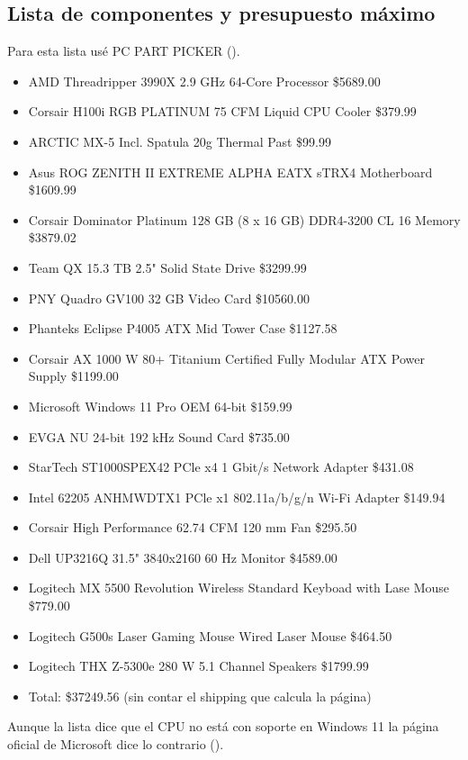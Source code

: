 \documentclass[12pt, a4paper, twocolumn]{article}
\begin{document}
\subsection{Lista de componentes y presupuesto máximo}
Para esta lista usé PC PART PICKER (\cite{partpickermaximum}).
\begin{itemize}
    \item AMD Threadripper 3990X 2.9 GHz 64-Core Processor                          \$5689.00
    \item Corsair H100i RGB PLATINUM 75 CFM Liquid CPU Cooler                       \$379.99
    \item ARCTIC MX-5 Incl. Spatula 20g Thermal Past                                \$99.99
    \item Asus ROG ZENITH II EXTREME ALPHA EATX sTRX4 Motherboard                   \$1609.99
    \item Corsair Dominator Platinum 128 GB (8 x 16 GB) DDR4-3200 CL 16 Memory      \$3879.02
    \item Team QX 15.3 TB 2.5" Solid State Drive                                    \$3299.99
    \item PNY Quadro GV100 32 GB Video Card                                         \$10560.00
    \item Phanteks Eclipse P4005 ATX Mid Tower Case                                 \$1127.58
    \item Corsair AX 1000 W 80+ Titanium Certified Fully Modular ATX Power Supply   \$1199.00
    \item Microsoft Windows 11 Pro OEM 64-bit                                       \$159.99
    \item EVGA NU 24-bit 192 kHz Sound Card                                         \$735.00
    \item StarTech ST1000SPEX42 PCle x4 1 Gbit/s Network Adapter                    \$431.08
    \item Intel 62205 ANHMWDTX1 PCle x1 802.11a/b/g/n Wi-Fi Adapter                 \$149.94
    \item Corsair High Performance 62.74 CFM 120 mm Fan                             \$295.50
    \item Dell UP3216Q 31.5" 3840x2160 60 Hz Monitor                                \$4589.00
    \item Logitech MX 5500 Revolution Wireless Standard Keyboad with Lase Mouse     \$779.00
    \item Logitech G500s Laser Gaming Mouse Wired Laser Mouse                       \$464.50
    \item Logitech THX Z-5300e 280 W 5.1 Channel Speakers                           \$1799.99
    \item Total: \$37249.56 (sin contar el shipping que calcula la página)
\end{itemize}
Aunque la lista dice que el CPU no está con soporte en Windows 11 la página oficial de Microsoft dice lo contrario (\cite{windows11Support}). 
\end{document}

